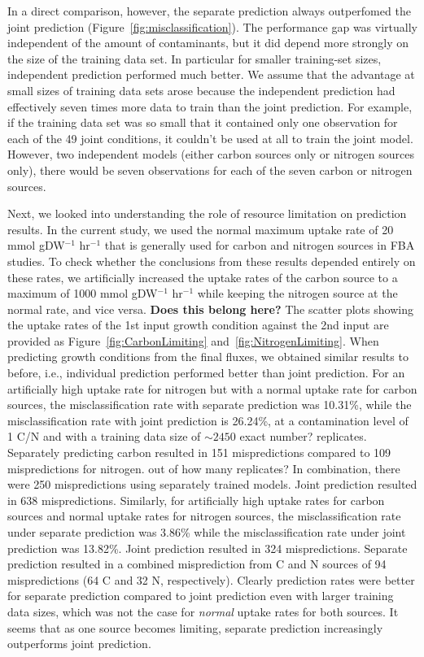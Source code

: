 \documentclass[12pt]{article}
\begin{document}
In a direct comparison, however, the separate prediction always outperfomed the joint prediction (Figure~\ref{fig:misclassification}). The performance gap was virtually independent of the amount of contaminants, but it did depend more strongly on the size of the training data set. In particular for smaller training-set sizes, independent prediction performed much better. We assume that the advantage at small sizes of training data sets arose because the independent prediction had effectively seven times more data to train than the joint prediction. For example, if the training data set was so small that it contained only one observation for each of the 49 joint conditions, it couldn't be used at all to train the joint model. However, two independent models (either carbon sources only or nitrogen sources only), there would be seven observations for each of the seven carbon or nitrogen sources.

Next, we looked into understanding the role of resource limitation on prediction results. In the current study, we used the normal maximum uptake rate of 20 mmol gDW$^{-1}$ hr$^{-1}$ that is generally used for carbon and nitrogen sources in FBA studies. To check whether the conclusions from these results depended entirely on these rates, we artificially increased the uptake rates of the carbon source to a maximum of 1000 mmol gDW$^{-1}$ hr$^{-1}$ while keeping the nitrogen source at the normal rate, and vice versa. {\color{red}\textbf{Does this belong here?} The scatter plots showing the uptake rates of the 1st input growth condition against the 2nd input are provided as Figure~\ref{fig:CarbonLimiting} and~\ref{fig:NitrogenLimiting}.} When predicting growth conditions from the final fluxes, we obtained similar results to before, i.e., individual prediction performed better than joint prediction. For an artificially high uptake rate for nitrogen but with a normal uptake rate for carbon sources, the misclassification rate with separate prediction was 10.31\%, while the  misclassification rate with joint prediction is 26.24\%, at a contamination level of 1 C/N and with a training data size of $\sim2450$ {\color{red}exact number?} replicates. Separately predicting carbon resulted in 151 mispredictions compared to 109 mispredictions for nitrogen. {\color{red}out of how many replicates?} In combination, there were 250 mispredictions using separately trained models. Joint prediction resulted in 638 mispredictions. Similarly, for artificially high uptake rates for carbon sources and normal uptake rates for nitrogen sources, the misclassification rate under separate prediction was 3.86\% while the misclassification rate under joint prediction was 13.82\%. Joint prediction resulted in 324 mispredictions. Separate prediction resulted in a combined misprediction from C and N sources of 94 mispredictions (64 C and 32 N, respectively). Clearly prediction rates were better for separate prediction compared to joint prediction even with larger training data sizes, which was not the case for \emph{normal} uptake rates for both sources. It seems that as one source becomes limiting, separate prediction increasingly outperforms joint prediction.
\end{document}
